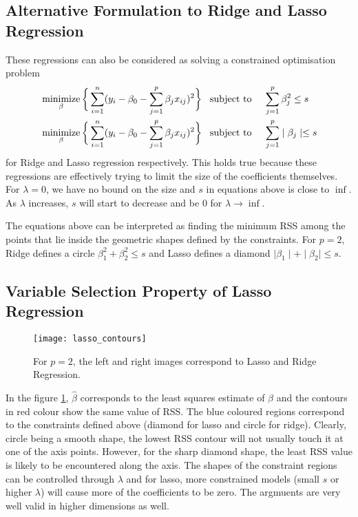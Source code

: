 \documentclass[../statistical_learning_notes.tex]{subfiles}
\begin{document}
    \subsection{Alternative Formulation to Ridge and Lasso Regression}\label{sec:alternative_ridge_lasso}
    These regressions can also be considered as solving a constrained optimisation problem
    \begin{align*}
        &\operatorname*{minimize}_{\beta}  \bigg\{\sum_{i=1}^{n} (y_{i} - \beta_{0} - \sum_{j=1}^{p}\beta_{j}x_{ij})^{2} \bigg\} \text{\;\;\;subject to\;} &&\sum_{j=1}^{p}\beta_{j}^{2} \leq s \\
        &\operatorname*{minimize}_{\beta}  \bigg\{\sum_{i=1}^{n} (y_{i} - \beta_{0} - \sum_{j=1}^{p}\beta_{j}x_{ij})^{2} \bigg\} \text{\;\;\;subject to\;} &&\sum_{j=1}^{p}\mid \beta_{j} \mid \leq s
    \end{align*}
    for Ridge and Lasso regression respectively. This holds true because these regressions are effectively trying to limit the size of the coefficients themselves. For $\lambda = 0$, we have no bound on the size and $s$ in equations above is close to $\inf$. As $\lambda$ increases, $s$ will start to decrease and be $0$ for $\lambda \to \inf$. \newline

    The equations above can be interpreted as finding the minimum RSS among the points that lie inside the geometric shapes defined by the constraints. For $p = 2$, Ridge defines a circle $\beta_{1}^{2} + \beta_{2}^{2} \leq s$ and Lasso defines a diamond $\mid \beta_{1} \mid + \mid \beta_{2} \mid \leq s$.

    
    \subsection{Variable Selection Property of Lasso Regression}
    \begin{figure}[h]
    \texttt{[image: lasso\_contours]}
    \centering
    \caption{For $p=2$, the left and right images correspond to Lasso and Ridge Regression.}
    \label{fig:lasso_contour} %
    \end{figure}

    In the figure \ref{fig:lasso_contour}, $\hat{\beta}$ corresponds to the least squares estimate of $\beta$ and the contours in red colour show the same value of RSS. The blue coloured regions correspond to the constraints defined above (diamond for lasso and circle for ridge).\newline
    Clearly, circle being a smooth shape, the lowest RSS contour will not usually touch it at one of the axis points. However, for the sharp diamond shape, the least RSS value is likely to be encountered along the axis. The shapes of the constraint regions can be controlled through $\lambda$ and for lasso, more constrained models (small $s$ or higher $\lambda$) will cause more of the coefficients to be zero. The argmuents are very well valid in higher dimensions as well.
    
\end{document}
